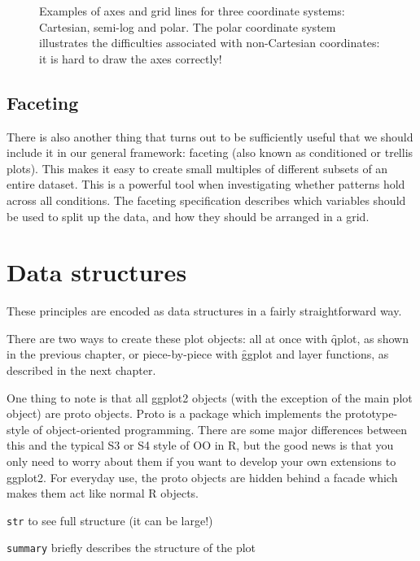 \begin{figure}[htbp]
	\centering
	\caption{Examples of axes and grid lines for three coordinate systems: Cartesian, semi-log and polar. The polar coordinate system illustrates the difficulties associated with non-Cartesian coordinates: it is hard to draw the axes correctly!}
	\label{fig:coord}
\end{figure}

\subsection{Faceting}\label{sec:faceting}

There is also another thing that turns out to be sufficiently useful that we should include it in our general framework: faceting (also known as conditioned or trellis plots). This makes it easy to create small multiples of different subsets of an entire dataset. This is a powerful tool when investigating whether patterns hold across all conditions.  The faceting specification describes which variables should be used to split up the data, and how they should be arranged in a grid.



\section{Data structures}
\label{sec:data_structures}

These principles are encoded as data structures in a fairly straightforward way.

There are two ways to create these plot objects: all at once with \f{qplot}, as shown in the previous chapter, or piece-by-piece with \f{ggplot} and layer functions, as described in the next chapter.

One thing to note is that all ggplot2 objects (with the exception of the main plot object) are proto objects.  Proto is a package which implements the prototype-style of object-oriented programming.  There are some major differences between this and the typical S3 or S4 style of OO in R, but the good news is that you only need to worry about them if you want to develop your own extensions to ggplot2.  For everyday use, the proto objects are hidden behind a facade which makes them act like normal R objects.

{\tt str} to see full structure (it can be large!)

{\tt summary} briefly describes the structure of the plot

